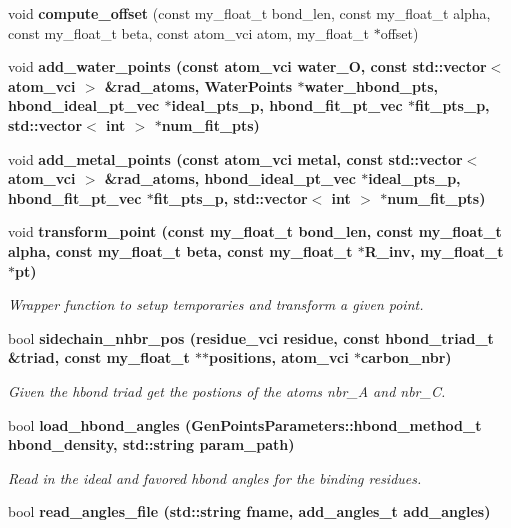 \begin{CompactItemize}
\item 
void \textbf{compute\_\-offset} (const my\_\-float\_\-t bond\_\-len, const my\_\-float\_\-t alpha, const my\_\-float\_\-t beta, const atom\_\-vci atom, my\_\-float\_\-t $\ast$offset)\label{classASCbase_1_1HbondPoints_e49c038430c23fd41cec0f86a7f8d3a0}

\item 
void \bf{add\_\-water\_\-points} (const atom\_\-vci water\_\-O, const std::vector$<$ atom\_\-vci $>$ \&rad\_\-atoms, \bf{Water\-Points} $\ast$water\_\-hbond\_\-pts, \bf{hbond\_\-ideal\_\-pt\_\-vec} $\ast$ideal\_\-pts\_\-p, \bf{hbond\_\-fit\_\-pt\_\-vec} $\ast$fit\_\-pts\_\-p, std::vector$<$ int $>$ $\ast$num\_\-fit\_\-pts)
\item 
void \bf{add\_\-metal\_\-points} (const atom\_\-vci metal, const std::vector$<$ atom\_\-vci $>$ \&rad\_\-atoms, \bf{hbond\_\-ideal\_\-pt\_\-vec} $\ast$ideal\_\-pts\_\-p, \bf{hbond\_\-fit\_\-pt\_\-vec} $\ast$fit\_\-pts\_\-p, std::vector$<$ int $>$ $\ast$num\_\-fit\_\-pts)
\item 
void \bf{transform\_\-point} (const my\_\-float\_\-t bond\_\-len, const my\_\-float\_\-t alpha, const my\_\-float\_\-t beta, const my\_\-float\_\-t $\ast$R\_\-inv, my\_\-float\_\-t $\ast$pt)
\begin{CompactList}\small\item\em Wrapper function to setup temporaries and transform a given point. \item\end{CompactList}\item 
bool \bf{sidechain\_\-nhbr\_\-pos} (residue\_\-vci residue, const \bf{hbond\_\-triad\_\-t} \&triad, const my\_\-float\_\-t $\ast$$\ast$positions, atom\_\-vci $\ast$carbon\_\-nbr)
\begin{CompactList}\small\item\em Given the hbond triad get the postions of the atoms nbr\_\-A and nbr\_\-C. \item\end{CompactList}\item 
bool \bf{load\_\-hbond\_\-angles} (\bf{Gen\-Points\-Parameters::hbond\_\-method\_\-t} hbond\_\-density, std::string param\_\-path)
\begin{CompactList}\small\item\em Read in the ideal and favored hbond angles for the binding residues. \item\end{CompactList}\item 
bool \bf{read\_\-angles\_\-file} (std::string fname, add\_\-angles\_\-t add\_\-angles)
$$
\end{CompactItemize}
